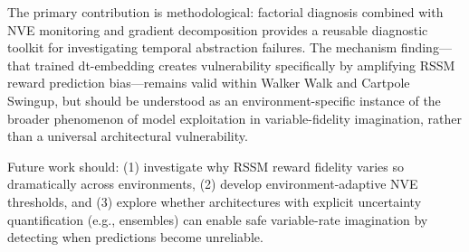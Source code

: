 \documentclass[10pt,twocolumn]{article}
\begin{document}
The primary contribution is methodological: factorial diagnosis combined with NVE monitoring and gradient decomposition provides a reusable diagnostic toolkit for investigating temporal abstraction failures. The mechanism finding---that trained dt-embedding creates vulnerability specifically by amplifying RSSM reward prediction bias---remains valid within Walker Walk and Cartpole Swingup, but should be understood as an environment-specific instance of the broader phenomenon of model exploitation in variable-fidelity imagination, rather than a universal architectural vulnerability.

Future work should: (1) investigate why RSSM reward fidelity varies so dramatically across environments, (2) develop environment-adaptive NVE thresholds, and (3) explore whether architectures with explicit uncertainty quantification (e.g., ensembles) can enable safe variable-rate imagination by detecting when predictions become unreliable.
\end{document}
